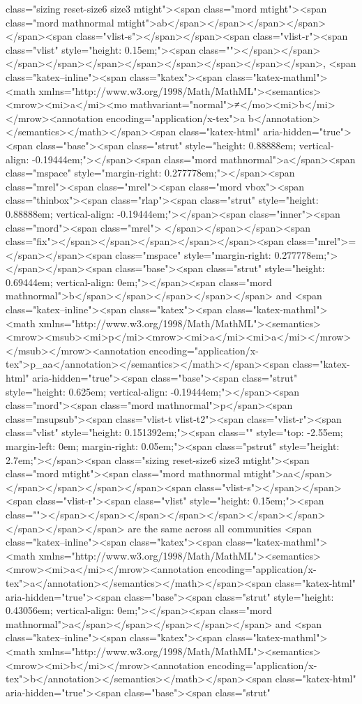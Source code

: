 class="sizing reset-size6 size3 mtight"><span class="mord mtight"><span class="mord mathnormal mtight">ab</span></span></span></span></span><span class="vlist-s">​</span></span><span class="vlist-r"><span class="vlist" style="height: 0.15em;"><span class=""></span></span></span></span></span></span></span></span></span></span>, <span class="katex--inline"><span class="katex"><span class="katex-mathml"><math xmlns="http://www.w3.org/1998/Math/MathML"><semantics><mrow><mi>a</mi><mo mathvariant="normal">≠</mo><mi>b</mi></mrow><annotation encoding="application/x-tex">a \neq b</annotation></semantics></math></span><span class="katex-html" aria-hidden="true"><span class="base"><span class="strut" style="height: 0.88888em; vertical-align: -0.19444em;"></span><span class="mord mathnormal">a</span><span class="mspace" style="margin-right: 0.277778em;"></span><span class="mrel"><span class="mrel"><span class="mord vbox"><span class="thinbox"><span class="rlap"><span class="strut" style="height: 0.88888em; vertical-align: -0.19444em;"></span><span class="inner"><span class="mord"><span class="mrel"></span></span></span><span class="fix"></span></span></span></span></span><span class="mrel">=</span></span><span class="mspace" style="margin-right: 0.277778em;"></span></span><span class="base"><span class="strut" style="height: 0.69444em; vertical-align: 0em;"></span><span class="mord mathnormal">b</span></span></span></span></span> and <span class="katex--inline"><span class="katex"><span class="katex-mathml"><math xmlns="http://www.w3.org/1998/Math/MathML"><semantics><mrow><msub><mi>p</mi><mrow><mi>a</mi><mi>a</mi></mrow></msub></mrow><annotation encoding="application/x-tex">p_{aa}</annotation></semantics></math></span><span class="katex-html" aria-hidden="true"><span class="base"><span class="strut" style="height: 0.625em; vertical-align: -0.19444em;"></span><span class="mord"><span class="mord mathnormal">p</span><span class="msupsub"><span class="vlist-t vlist-t2"><span class="vlist-r"><span class="vlist" style="height: 0.151392em;"><span class="" style="top: -2.55em; margin-left: 0em; margin-right: 0.05em;"><span class="pstrut" style="height: 2.7em;"></span><span class="sizing reset-size6 size3 mtight"><span class="mord mtight"><span class="mord mathnormal mtight">aa</span></span></span></span></span><span class="vlist-s">​</span></span><span class="vlist-r"><span class="vlist" style="height: 0.15em;"><span class=""></span></span></span></span></span></span></span></span></span></span> are the same across all communities <span class="katex--inline"><span class="katex"><span class="katex-mathml"><math xmlns="http://www.w3.org/1998/Math/MathML"><semantics><mrow><mi>a</mi></mrow><annotation encoding="application/x-tex">a</annotation></semantics></math></span><span class="katex-html" aria-hidden="true"><span class="base"><span class="strut" style="height: 0.43056em; vertical-align: 0em;"></span><span class="mord mathnormal">a</span></span></span></span></span> and <span class="katex--inline"><span class="katex"><span class="katex-mathml"><math xmlns="http://www.w3.org/1998/Math/MathML"><semantics><mrow><mi>b</mi></mrow><annotation encoding="application/x-tex">b</annotation></semantics></math></span><span class="katex-html" aria-hidden="true"><span class="base"><span class="strut" 